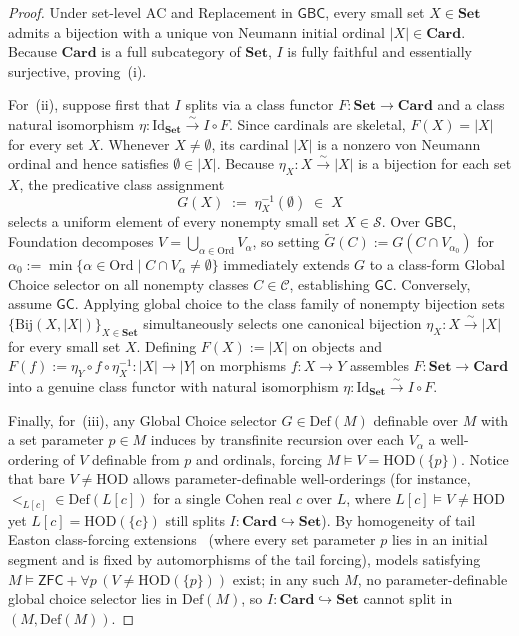 \begin{proof}
Under set-level $\mathrm{AC}$ and Replacement in $\mathsf{GBC}$, every small set $X \in \mathbf{Set}$ admits a bijection with a unique von Neumann initial ordinal $|X| \in \mathbf{Card}$. Because $\mathbf{Card}$ is a full subcategory of $\mathbf{Set}$, $I$ is fully faithful and essentially surjective, proving~(i).

For~(ii), suppose first that $I$ splits via a class functor $F : \mathbf{Set} \to \mathbf{Card}$ and a class natural isomorphism $\eta : \mathrm{Id}_{\mathbf{Set}} \xrightarrow{\sim} I \circ F$. Since cardinals are skeletal, $F(X) = |X|$ for every set $X$. Whenever $X \neq \emptyset$, its cardinal $|X|$ is a nonzero von Neumann ordinal and hence satisfies $\emptyset \in |X|$. Because $\eta_X : X \xrightarrow{\sim} |X|$ is a bijection for each set $X$, the predicative class assignment
\[
  G(X) \;:=\; \eta_X^{-1}(\emptyset) \;\in\; X
\]
selects a uniform element of every nonempty small set $X \in \mathcal{S}$. Over $\mathsf{GBC}$, Foundation decomposes $V = \bigcup_{\alpha \in \mathrm{Ord}} V_\alpha$, so setting $\tilde{G}(C) := G(C \cap V_{\alpha_0})$ for $\alpha_0 := \min\{\alpha \in \mathrm{Ord} \mid C \cap V_\alpha \neq \emptyset\}$ immediately extends $G$ to a class-form Global Choice selector on all nonempty classes $C \in \mathcal{C}$, establishing $\mathsf{GC}$. Conversely, assume $\mathsf{GC}$. Applying global choice to the class family of nonempty bijection sets $\{\mathrm{Bij}(X, |X|)\}_{X \in \mathbf{Set}}$ simultaneously selects one canonical bijection $\eta_X : X \xrightarrow{\sim} |X|$ for every small set $X$. Defining $F(X) := |X|$ on objects and $F(f) := \eta_Y \circ f \circ \eta_X^{-1} : |X| \to |Y|$ on morphisms $f : X \to Y$ assembles $F : \mathbf{Set} \to \mathbf{Card}$ into a genuine class functor with natural isomorphism $\eta : \mathrm{Id}_{\mathbf{Set}} \xrightarrow{\sim} I \circ F$.

Finally, for~(iii), any Global Choice selector $G \in \mathrm{Def}(M)$ definable over $M$ with a set parameter $p \in M$ induces by transfinite recursion over each $V_\alpha$ a well-ordering of $V$ definable from $p$ and ordinals, forcing $M \models V = \mathrm{HOD}(\{p\})$. Notice that bare $V \neq \mathrm{HOD}$ allows parameter-definable well-orderings (for instance, $<_{L[c]} \in \mathrm{Def}(L[c])$ for a single Cohen real $c$ over $L$, where $L[c] \models V \neq \mathrm{HOD}$ yet $L[c] = \mathrm{HOD}(\{c\})$ still splits $I : \mathbf{Card} \hookrightarrow \mathbf{Set}$). By homogeneity of tail Easton class-forcing extensions~\cite{Easton70} (where every set parameter $p$ lies in an initial segment and is fixed by automorphisms of the tail forcing), models satisfying $M \models \mathsf{ZFC} + \forall p\,(V \neq \mathrm{HOD}(\{p\}))$ exist; in any such $M$, no parameter-definable global choice selector lies in $\mathrm{Def}(M)$, so $I : \mathbf{Card} \hookrightarrow \mathbf{Set}$ cannot split in $(M, \mathrm{Def}(M))$.
\end{proof}

